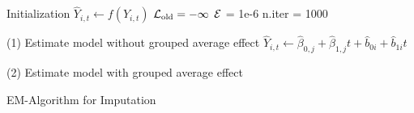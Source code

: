 \documentclass[nojss]{jss}\usepackage[]{graphicx}\usepackage[]{color}
\begin{document}
\begin{algorithm}
  \SetAlgoLined
  \BlankLine
  Initialization\;
  \Indp\Indp\Indp 
  $\hat{Y}_{i, t} \leftarrow f(Y_{i, t})$\;
  $\cal{L}_{\text{old}} = -\infty$\;
  $\cal{E}$ = 1e-6\;
  n.iter = 1000\;
  \Indm\Indm\Indm

  (1) Estimate model without grouped average effect\;
  \Indp\Indp\Indp  
  $\hat{Y}_{i, t} \leftarrow \hat{\beta}_{0,j} + \hat{\beta}_{1,j}t +
  \hat{b}_{0i} + \hat{b}_{1i}t $\;
  \Indm\Indm\Indm
  
  (2) Estimate model with grouped average effect\;
    
    
    \caption{EM-Algorithm for Imputation}
    \label{alg:imputation}
\end{algorithm}
  
      
\end{document}
